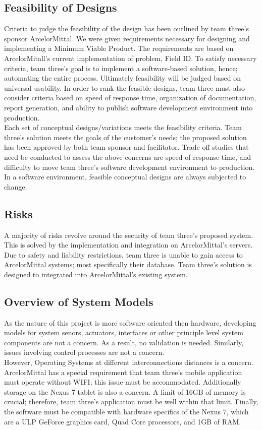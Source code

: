 \documentclass[Letter,11pt]{article}
\begin{document}
	\subsection{Feasibility of Designs}
	Criteria to judge the feasibility of the design has been outlined by team three's sponsor ArcelorMittal. We were given requirements necessary for designing and implementing a Minimum Viable Product. The requirements are based on ArcelorMitall's current implementation of problem, Field ID. To satisfy necessary criteria, team three's goal is to implement a software-based solution, hence; automating the entire process. Ultimately feasibility will be judged based on universal usability. In order to rank the feasible designs, team three must also consider criteria based on speed of response time, organization of documentation, report generation, and ability to publish software development environment into production. \\
	Each set of conceptual designs/variations meets the feasibility criteria. Team three's solution meets the goals of the customer's needs; the proposed solution has been approved by both team sponsor and facilitator. Trade off studies that need be conducted to assess the above concerns are speed of response time, and difficulty to move team three's software development environment to production. In a software environment, feasible conceptual designs are always subjected to change. \\
	\subsection{Risks}
	A majority of risks revolve around the security of team three's proposed system. This is solved by the implementation and integration on ArcelorMittal's servers. Due to safety and liability restrictions, team three is unable to gain access to ArcelorMittal systems; most specifically their database. Team three's solution is designed to integrated into ArcelorMittal's existing system. \\
	\subsection{Overview of System Models}
	As the nature of this project is more software oriented then hardware, developing models for system senors, actuators, interfaces or other principle level system components are not a concern. As a result, no validation is needed. Similarly, issues involving control processes are not a concern. \\
	However, Operating Systems at different interconnections distances is a concern. ArcelorMittal has a special requirement that team three's mobile application must operate without WIFI; this issue must be accommodated. Additionally storage on the Nexus 7 tablet is also a concern. A limit of 16GB of memory is crucial; therefore, team three's application must be well within that limit.  Finally, the software must be compatible with hardware specifics of the Nexus 7, which are a ULP GeForce graphics card, Quad Core processors, and 1GB of RAM. \\
	
\end{document}
